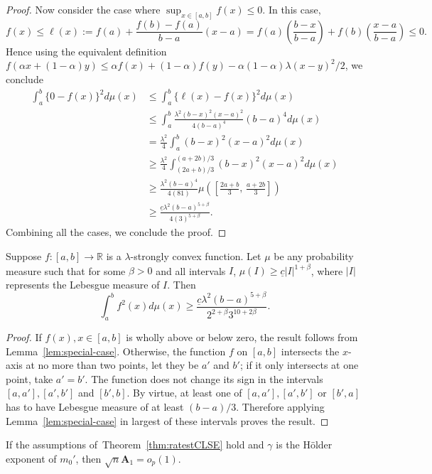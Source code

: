 {{\begin{proof}
Now consider the case where $\sup_{x\in[a,b]}f(x) \le 0$. In this case,
\[
f(x) \le \ell(x) := f(a) + \frac{f(b) - f(a)}{b - a}(x - a) = f(a)\left(\frac{b-x}{b - a}\right) + f(b)\left(\frac{x - a}{b - a}\right) \le 0.
\]
Hence using the equivalent definition $f(\alpha x + (1 - \alpha)y) \le \alpha f(x) + (1 - \alpha)f(y) - \alpha(1-\alpha)\lambda(x - y)^2/2$, we conclude
\begin{align*}
\int_a^b \{0 - f(x)\}^2d\mu(x) &\le \int_a^b \{\ell(x) - f(x)\}^2d\mu(x)\\ 
&\le \int_a^b \frac{\lambda^2(b - x)^2(x - a)^2}{4(b-a)^4}(b - a)^4d\mu(x)\\
&= \frac{\lambda^2}{4}\int_a^b (b - x)^2(x - a)^2d\mu(x)\\
&\ge \frac{\lambda^2}{4}\int_{(2a + b)/3}^{(a + 2b)/3} (b - x)^2(x - a)^2d\mu(x)\\
&\ge \frac{\lambda^2(b - a)^4}{4(81)}\mu\left(\left[\frac{2a + b}{3},\,\frac{a + 2b}{3}\right]\right)\\
&\ge \frac{\underline{c}\lambda^2(b-a)^{5 + \beta}}{4(3)^{5 + \beta}}.
\end{align*}
Combining all the cases, we conclude the proof.
\end{proof}

\begin{thm}\label{thm:strong-convex-L2-norm}
Suppose $f:[a,b]\to\mathbb{R}$ is a $\lambda$-strongly convex function. Let $\mu$ be any probability measure such that for some $\beta > 0$ and all intervals $I$, $\mu(I) \ge \underline{c}|I|^{1 + \beta}$, where $|I|$ represents the Lebesgue measure of $I$. Then
\[
\int_a^b f^2(x)d\mu(x) \ge \frac{\underline{c}\lambda^2(b - a)^{5 + \beta}}{2^{2 + \beta}3^{10 + 2\beta}}.
\]
\end{thm}
\begin{proof}
If $f(x), x\in[a,b]$ is wholly above or below zero, the result follows from Lemma~\ref{lem:special-case}. Otherwise, the function $f$ on $[a, b]$ intersects the $x$-axis at no more than two points, let they be $a'$ and $b'$; if it only intersects at one point, take $a' = b'$. The function does not change its sign in the intervals $[a, a'], [a', b']$ and $[b', b]$. By virtue, at least one of $[a, a'], [a', b']$ or $[b', a]$ has to have Lebesgue measure of at least $(b - a)/3$. Therefore applying Lemma~\ref{lem:special-case} in largest of these intervals proves the result.
\end{proof}}

\begin{lemma}\label{lem:score_aprx_1} If the assumptions of~Theorem~\ref{thm:ratestCLSE} hold and $\gamma$ is the H\"{o}lder exponent of $m_0'$, then $\sqrt{n}\mathbf{A}_1= o_p(1).$


\end{lemma}}
